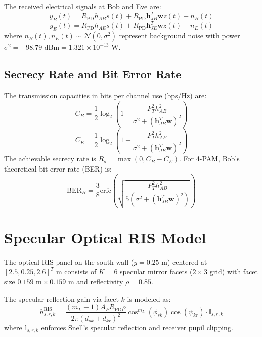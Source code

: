 \documentclass[journal,10pt,twocolumn]{IEEEtran}
\begin{document}
The received electrical signals at Bob and Eve are:
\begin{equation}
y_B(t) = R_{\text{PD}} h_{AB} s(t) + R_{\text{PD}} \mathbf{h}_{JB}^T \mathbf{w} z(t) + n_B(t)
\end{equation}
\begin{equation}
y_E(t) = R_{\text{PD}} h_{AE} s(t) + R_{\text{PD}} \mathbf{h}_{JE}^T \mathbf{w} z(t) + n_E(t)
\end{equation}
where $n_B(t), n_E(t) \sim \mathcal{N}(0, \sigma^2)$ represent background noise with power $\sigma^2 = -98.79\text{ dBm} = 1.321 \times 10^{-13}\text{ W}$.

\subsection{Secrecy Rate and Bit Error Rate}
The transmission capacities in bits per channel use (bps/Hz) are:
\begin{equation}
C_B = \frac{1}{2} \log_2 \left( 1 + \frac{P_T^2 h_{AB}^2}{\sigma^2 + (\mathbf{h}_{JB}^T \mathbf{w})^2} \right)
\end{equation}
\begin{equation}
C_E = \frac{1}{2} \log_2 \left( 1 + \frac{P_T^2 h_{AE}^2}{\sigma^2 + (\mathbf{h}_{JE}^T \mathbf{w})^2} \right)
\end{equation}
The achievable secrecy rate is $R_s = \max(0, C_B - C_E)$. For 4-PAM, Bob's theoretical bit error rate (BER) is:
\begin{equation}
\text{BER}_B = \frac{3}{8} \text{erfc}\left( \sqrt{ \frac{P_T^2 h_{AB}^2}{5 (\sigma^2 + (\mathbf{h}_{JB}^T \mathbf{w})^2)} } \right)
\end{equation}

\section{Specular Optical RIS Model}
The optical RIS panel on the south wall ($y = 0.25\text{ m}$) centered at $[2.5, 0.25, 2.6]^T\text{ m}$ consists of $K = 6$ specular mirror facets ($2 \times 3$ grid) with facet size $0.159\text{ m} \times 0.159\text{ m}$ and reflectivity $\rho = 0.85$.

The specular reflection gain via facet $k$ is modeled as:
\begin{equation}
h_{s,r,k}^{\text{RIS}} = \frac{(m_L + 1) A_P R_{\text{PD}} \rho}{2\pi (d_{sk} + d_{kr})^2} \cos^{m_L}(\phi_{sk}) \cos(\psi_{kr}) \cdot \mathbb{I}_{s,r,k}
\end{equation}
where $\mathbb{I}_{s,r,k}$ enforces Snell's specular reflection and receiver pupil clipping.
\end{document}
